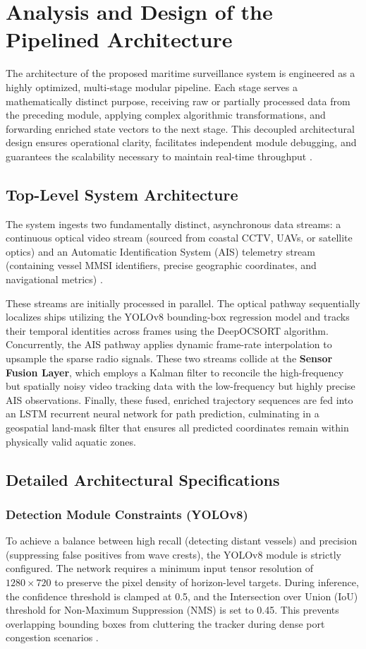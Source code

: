 \chapter{Analysis and Design of the Pipelined Architecture}

The architecture of the proposed maritime surveillance system is engineered as a highly optimized, multi-stage modular pipeline. Each stage serves a mathematically distinct purpose, receiving raw or partially processed data from the preceding module, applying complex algorithmic transformations, and forwarding enriched state vectors to the next stage. This decoupled architectural design ensures operational clarity, facilitates independent module debugging, and guarantees the scalability necessary to maintain real-time throughput \citep{Ref04}.

\section{Top-Level System Architecture}
The system ingests two fundamentally distinct, asynchronous data streams: a continuous optical video stream (sourced from coastal CCTV, UAVs, or satellite optics) and an Automatic Identification System (AIS) telemetry stream (containing vessel MMSI identifiers, precise geographic coordinates, and navigational metrics) \citep{Ref05}. 

These streams are initially processed in parallel. The optical pathway sequentially localizes ships utilizing the YOLOv8 bounding-box regression model and tracks their temporal identities across frames using the DeepOCSORT algorithm. Concurrently, the AIS pathway applies dynamic frame-rate interpolation to upsample the sparse radio signals. These two streams collide at the \textbf{Sensor Fusion Layer}, which employs a Kalman filter to reconcile the high-frequency but spatially noisy video tracking data with the low-frequency but highly precise AIS observations. Finally, these fused, enriched trajectory sequences are fed into an LSTM recurrent neural network for path prediction, culminating in a geospatial land-mask filter that ensures all predicted coordinates remain within physically valid aquatic zones.

\section{Detailed Architectural Specifications}

\subsection{Detection Module Constraints (YOLOv8)}
To achieve a balance between high recall (detecting distant vessels) and precision (suppressing false positives from wave crests), the YOLOv8 module is strictly configured. The network requires a minimum input tensor resolution of $1280 \times 720$ to preserve the pixel density of horizon-level targets. During inference, the confidence threshold is clamped at 0.5, and the Intersection over Union (IoU) threshold for Non-Maximum Suppression (NMS) is set to 0.45. This prevents overlapping bounding boxes from cluttering the tracker during dense port congestion scenarios \citep{Ref06}.

